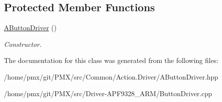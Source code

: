 \subsection*{Protected Member Functions}
\begin{DoxyCompactItemize}
\item 
\mbox{\label{classAButtonDriver_a035c36655b359b7e8e3ae0a3be85c0c9}} 
\hyperlink{classAButtonDriver_a035c36655b359b7e8e3ae0a3be85c0c9}{A\+Button\+Driver} ()
\begin{DoxyCompactList}\small\item\em Constructor. \end{DoxyCompactList}\end{DoxyCompactItemize}


The documentation for this class was generated from the following files\+:\begin{DoxyCompactItemize}
\item 
/home/pmx/git/\+P\+M\+X/src/\+Common/\+Action.\+Driver/A\+Button\+Driver.\+hpp\item 
/home/pmx/git/\+P\+M\+X/src/\+Driver-\/\+A\+P\+F9328\+\_\+\+A\+R\+M/Button\+Driver.\+cpp\end{DoxyCompactItemize}
